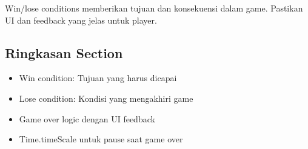 \begin{catatan}
Win/lose conditions memberikan tujuan dan konsekuensi dalam game. Pastikan UI dan feedback yang jelas untuk player.
\end{catatan}

\subsection{Ringkasan Section}

\begin{itemize}
\item Win condition: Tujuan yang harus dicapai
\item Lose condition: Kondisi yang mengakhiri game
\item Game over logic dengan UI feedback
\item Time.timeScale untuk pause saat game over
\end{itemize}
